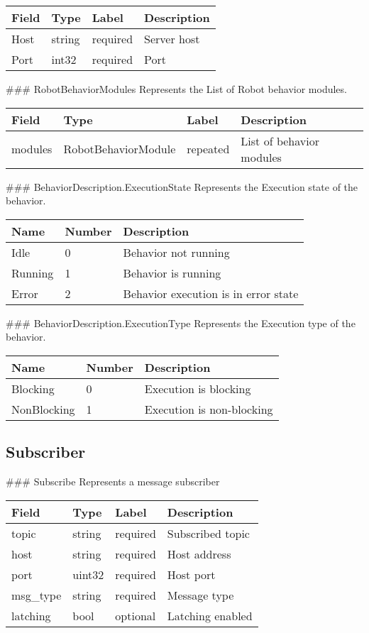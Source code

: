 \begin{longtable}[l]{@{}llll@{}}
\toprule
Field & Type & Label & Description\tabularnewline
\midrule
\endhead
Host & string & required & Server host\tabularnewline
Port & int32 & required & Port\tabularnewline
\bottomrule
\end{longtable}

 \#\#\# RobotBehaviorModules Represents the List of Robot behavior
modules.

\begin{longtable}[l]{@{}llll@{}}
\toprule
Field & Type & Label & Description\tabularnewline
\midrule
\endhead
modules & RobotBehaviorModule & repeated & List of behavior
modules\tabularnewline
\bottomrule
\end{longtable}

 \#\#\# BehaviorDescription.ExecutionState Represents the Execution
state of the behavior.

\begin{longtable}[l]{@{}lll@{}}
\toprule
Name & Number & Description\tabularnewline
\midrule
\endhead
Idle & 0 & Behavior not running\tabularnewline
Running & 1 & Behavior is running\tabularnewline
Error & 2 & Behavior execution is in error state\tabularnewline
\bottomrule
\end{longtable}

 \#\#\# BehaviorDescription.ExecutionType Represents the Execution type
of the behavior.

\begin{longtable}[l]{@{}lll@{}}
\toprule
Name & Number & Description\tabularnewline
\midrule
\endhead
Blocking & 0 & Execution is blocking\tabularnewline
NonBlocking & 1 & Execution is non-blocking\tabularnewline
\bottomrule
\end{longtable}

\subsection{Subscriber}\label{subscribe.proto}

 \#\#\# Subscribe Represents a message subscriber

\begin{longtable}[l]{@{}llll@{}}
\toprule
Field & Type & Label & Description\tabularnewline
\midrule
\endhead
topic & string & required & Subscribed topic\tabularnewline
host & string & required & Host address\tabularnewline
port & uint32 & required & Host port\tabularnewline
msg\_type & string & required & Message type\tabularnewline
latching & bool & optional & Latching enabled\tabularnewline
\bottomrule
\end{longtable}

